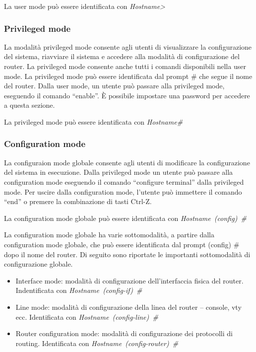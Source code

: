 La user mode può essere identificata con \emph{Hostname>}

\subsubsection{Privileged mode}
La modalità privileged mode consente agli utenti di visualizzare la configurazione del sistema, riavviare il sistema e accedere alla modalità di configurazione del router. La privileged mode consente anche tutti i comandi disponibili nella user mode. La privileged mode può essere identificata dal prompt \# che segue il nome del router. Dalla user mode, un utente può passare alla privileged mode, eseguendo il comando “enable”. È possibile impostare una password per accedere a questa sezione.

La privileged mode può essere identificata con \emph{Hostname\#}

\subsubsection{Configuration mode}
La configuraion mode globale consente agli utenti di modificare la configurazione del sistema in esecuzione. Dalla privileged mode un utente può passare alla configuration mode eseguendo il comando “configure terminal” dalla privileged mode. Per uscire dalla configuration mode, l’utente può immettere il comando “end” o premere la combinazione di tasti Ctrl-Z.

La configuration mode globale può essere identificata con \emph{Hostname~(config)~\#}

La configuration mode globale ha varie sottomodalità, a partire dalla configuration mode globale, che può essere identificata dal prompt (config) \# dopo il nome del router. Di seguito sono riportate le importanti sottomodalità di configurazione globale.

\begin{itemize}
    \item Interface mode: modalità di configurazione dell’interfaccia fisica del router. Indentificata con \emph{Hostname~(config-if)~\#}
    \item Line mode: modalità di configurazione della linea del router – console, vty ecc. Identificata con \emph{Hostname~(config-line)~\#}
    \item Router configuration mode: modalità di configurazione dei protocolli di routing. Identificata con \emph{Hostname~(config-router)~\#}
\end{itemize}

